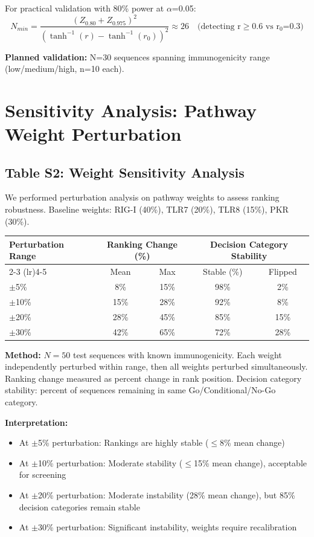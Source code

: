 \documentclass{article}
\begin{document}
For practical validation with 80\% power at $\alpha$=0.05:
\begin{equation}
N_{min} = \frac{(Z_{0.80} + Z_{0.975})^2}{(\tanh^{-1}(r) - \tanh^{-1}(r_0))^2} \approx 26 \quad \text{(detecting r$\geq$0.6 vs r$_0$=0.3)}
\end{equation}

\textbf{Planned validation:} N=30 sequences spanning immunogenicity range (low/medium/high, n=10 each).

\section{Sensitivity Analysis: Pathway Weight Perturbation}

\subsection{Table S2: Weight Sensitivity Analysis}

We performed perturbation analysis on pathway weights to assess ranking robustness. Baseline weights: RIG-I (40\%), TLR7 (20\%), TLR8 (15\%), PKR (30\%).

\begin{longtable}{lcccc}
\toprule
\multirow{2}{*}{Perturbation Range} & \multicolumn{2}{c}{Ranking Change (\%)} & \multicolumn{2}{c}{Decision Category Stability} \\
\cmidrule(lr){2-3} \cmidrule(lr){4-5}
 & Mean & Max & Stable (\%) & Flipped \\
\midrule
$\pm$5\% & 8\% & 15\% & 98\% & 2\% \\
$\pm$10\% & 15\% & 28\% & 92\% & 8\% \\
$\pm$20\% & 28\% & 45\% & 85\% & 15\% \\
$\pm$30\% & 42\% & 65\% & 72\% & 28\% \\
\bottomrule
\end{longtable}

\textbf{Method:} $N=50$ test sequences with known immunogenicity. Each weight independently perturbed within range, then all weights perturbed simultaneously. Ranking change measured as percent change in rank position. Decision category stability: percent of sequences remaining in same Go/Conditional/No-Go category.

\textbf{Interpretation:}
\begin{itemize}
\item At $\pm$5\% perturbation: Rankings are highly stable ($\leq$8\% mean change)
\item At $\pm$10\% perturbation: Moderate stability ($\leq$15\% mean change), acceptable for screening
\item At $\pm$20\% perturbation: Moderate instability (28\% mean change), but 85\% decision categories remain stable
\item At $\pm$30\% perturbation: Significant instability, weights require recalibration
\end{itemize}
\end{document}
